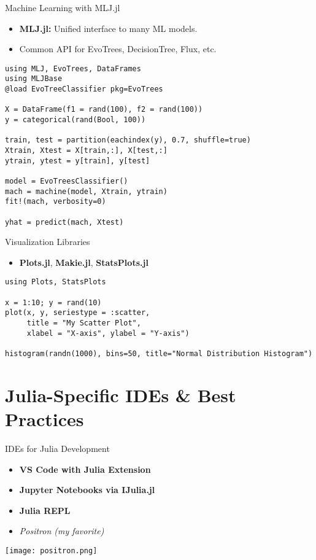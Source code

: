 \documentclass{beamer}
\begin{document}
\begin{frame}[fragile]{Machine Learning with MLJ.jl}
\begin{itemize}
    \item \textbf{MLJ.jl:} Unified interface to many ML models.
    \item Common API for EvoTrees, DecisionTree, Flux, etc.
\end{itemize}
\begin{lstlisting}
using MLJ, EvoTrees, DataFrames
using MLJBase
@load EvoTreeClassifier pkg=EvoTrees

X = DataFrame(f1 = rand(100), f2 = rand(100))
y = categorical(rand(Bool, 100))

train, test = partition(eachindex(y), 0.7, shuffle=true)
Xtrain, Xtest = X[train,:], X[test,:]
ytrain, ytest = y[train], y[test]

model = EvoTreesClassifier()
mach = machine(model, Xtrain, ytrain)
fit!(mach, verbosity=0)

yhat = predict(mach, Xtest)
\end{lstlisting}
\end{frame}

\begin{frame}[fragile]{Visualization Libraries}
\begin{itemize}
    \item \textbf{Plots.jl}, \textbf{Makie.jl}, \textbf{StatsPlots.jl}
\end{itemize}
\begin{lstlisting}
using Plots, StatsPlots

x = 1:10; y = rand(10)
plot(x, y, seriestype = :scatter,
     title = "My Scatter Plot",
     xlabel = "X-axis", ylabel = "Y-axis")

histogram(randn(1000), bins=50, title="Normal Distribution Histogram")
\end{lstlisting}
\end{frame}

\section{Julia-Specific IDEs \& Best Practices}

\begin{frame}{IDEs for Julia Development}
\begin{itemize}

    \item \textbf{VS Code with Julia Extension}
    \item \textbf{Jupyter Notebooks via IJulia.jl}
    \item \textbf{Julia REPL}
    \item \textit{Positron (my favorite)}
\end{itemize}
    \begin{center}
        \texttt{[image: positron.png]}
    \end{center}
\end{frame}
\end{document}
